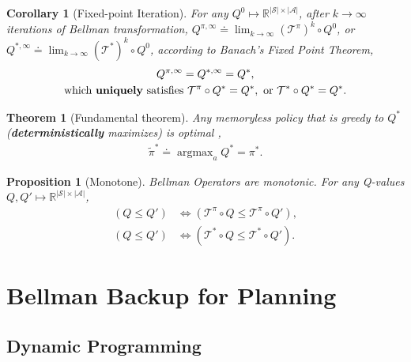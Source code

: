 \documentclass{article} %
\DeclareMathOperator*{\argmax}{argmax}
\newtheorem{theorem}{Theorem}
\newtheorem{proposition}{Proposition}
\newtheorem{corollary}{Corollary}
\begin{document}
\begin{corollary} [Fixed-point Iteration] \label{them:fixpoint}
	For any $Q^0 \mapsto \mathbb{R}^{|\mathcal{S}| \times |\mathcal{A}|}$, after $k\to \infty$ iterations of Bellman transformation, $Q^{\pi, \infty} \doteq \lim_{k \to\infty} (\mathcal{T}^\pi)^k \circ Q^0$, or $ Q^{*, \infty} \doteq \lim_{k\to\infty} (\mathcal{T}^*)^k \circ Q^0$, according to Banach's Fixed Point Theorem,
	\begin{equation}
	\begin{gathered}
		Q^{\pi, \infty}=Q^{*, \infty}=Q^*, \\ \text{which \textbf{uniquely} satisfies } \mathcal{T}^\pi \circ Q^*  = Q^*, \text{ or } \mathcal{T}^* \circ Q^*  = Q^*.
	\end{gathered}
	\end{equation}
\end{corollary}

\begin{theorem} [Fundamental theorem] \label{them:fundamental}
	Any memoryless policy that is greedy to $Q^*$ (\textbf{deterministically} maximizes) is optimal \cite{szepesvari2010algorithms},
	\begin{equation}
	\begin{aligned}
		\tilde{\pi}^{*} \doteq \argmax_aQ^* = \pi^*.
	\end{aligned}
	\end{equation}
\end{theorem}

\begin{proposition} [Monotone]
	Bellman Operators are monotonic. For any Q-values $Q,Q' \mapsto \mathbb{R}^{|\mathcal{S}| \times |\mathcal{A}|}$,
	\begin{equation}
	\begin{aligned}
		\left (Q\leqslant Q'\right ) &\Leftrightarrow \left (\mathcal{T}^\pi \circ Q\leqslant \mathcal{T}^\pi \circ Q'\right ),\\
		\left (Q\leqslant Q'\right )&\Leftrightarrow \left (\mathcal{T}^* \circ Q\leqslant \mathcal{T}^* \circ Q'\right ).
	\end{aligned}
	\end{equation}
\end{proposition}

\section{Bellman Backup for Planning}

\subsection{Dynamic Programming}
\end{document}
